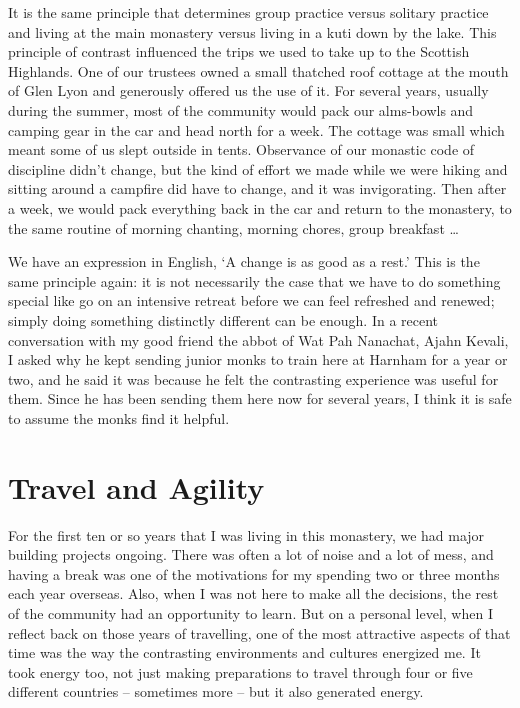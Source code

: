 It is the same principle that determines group practice versus solitary
practice and living at the main monastery versus living in a kuti down
by the lake. This principle of contrast influenced the trips we used to
take up to the Scottish Highlands. One of our trustees owned a small
thatched roof cottage at the mouth of Glen Lyon and generously offered
us the use of it. For several years, usually during the summer, most of
the community would pack our alms-bowls and camping gear in the car and
head north for a week. The cottage was small which meant some of us
slept outside in tents. Observance of our monastic code of discipline
didn't change, but the kind of effort we made while we were hiking and
sitting around a campfire did have to change, and it was invigorating.
Then after a week, we would pack everything back in the car and return
to the monastery, to the same routine of morning chanting, morning
chores, group breakfast \ldots{}

We have an expression in English, `A change is as good as a rest.' This
is the same principle again: it is not necessarily the case that we have
to do something special like go on an intensive retreat before we can
feel refreshed and renewed; simply doing something distinctly different
can be enough. In a recent conversation with my good friend the abbot of
Wat Pah Nanachat, Ajahn Kevali, I asked why he kept sending junior monks
to train here at Harnham for a year or two, and he said it was because
he felt the contrasting experience was useful for them.
Since he has been sending them here now for
several years, I think it is safe to assume the monks find it helpful.

\section{Travel and Agility}

For the first ten or so years that I was living in this monastery, we
had major building projects ongoing. There was often a lot of noise and
a lot of mess, and having a break was one of the motivations for my
spending two or three months each year overseas. Also, when I was not
here to make all the decisions, the rest of the community had an
opportunity to learn. But on a personal level, when I reflect back on
those years of travelling, one of the most attractive aspects of that
time was the way the contrasting environments and cultures energized me.
It took energy too, not just making preparations to travel through four
or five different countries -- sometimes more -- but it also generated
energy.

